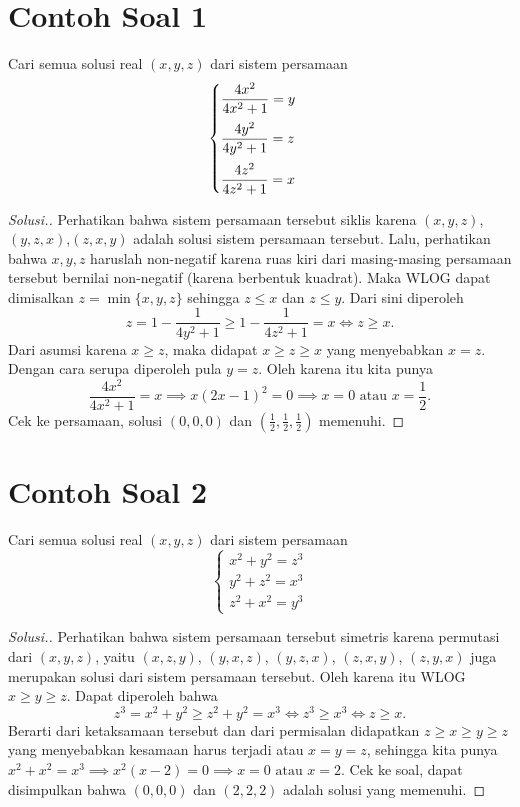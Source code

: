 \documentclass[12pt]{scrartcl}
\begin{document}
\section{Contoh Soal 1}
\begin{example*}
Cari semua solusi real $(x,y,z)$ dari sistem persamaan\\[-10pt] 
		$$\begin{cases}
			\vspace{2mm}
			\dfrac{4x^2}{4x^2+1}=y \\
			\vspace{2mm}
			\dfrac{4y^2}{4y^2+1}=z \\
			\dfrac{4z^2}{4z^2+1}=x
		\end{cases}$$
\end{example*}
\begin{proof}[Solusi.]
Perhatikan bahwa sistem persamaan tersebut siklis karena $(x,y,z)$,
$(y,z,x)$,$(z,x,y)$ adalah solusi sistem persamaan tersebut. Lalu, perhatikan bahwa $x,y,z$ haruslah non-negatif karena ruas kiri dari masing-masing persamaan tersebut bernilai non-negatif (karena berbentuk kuadrat). Maka WLOG dapat dimisalkan $z = \min\{x,y,z\}$ sehingga $z \le x$ dan $z \le y$. Dari sini diperoleh
$$z=1-\dfrac{1}{4y^2+1} \ge 1-\dfrac{1}{4z^2+1}=x \iff z \ge x.$$
Dari asumsi karena $x \ge z$, maka didapat $x \ge z \ge x$ yang menyebabkan $x=z$. Dengan cara serupa diperoleh pula $y=z$. Oleh karena itu kita punya
$$\dfrac{4x^2}{4x^2+1}=x \implies x(2x-1)^2=0 \implies x=0 \text{ atau } x=\frac{1}{2}.$$
Cek ke persamaan, solusi $(0,0,0)$ dan $(\frac{1}{2}, \frac{1}{2}, \frac{1}{2})$ memenuhi.

\end{proof}

\section{Contoh Soal 2}
\begin{example*}
Cari semua solusi real $(x,y,z)$ dari sistem persamaan\\[-10pt] 
		$$\begin{cases}
			x^2+y^2 = z^3\\
			y^2+z^2 = x^3\\
			z^2+x^2 = y^3
		\end{cases}$$
\end{example*}
\begin{proof}[Solusi.] Perhatikan bahwa sistem persamaan tersebut simetris karena permutasi dari $(x,y,z)$, yaitu $(x,z,y)$,  $(y,x,z)$, $(y,z,x)$, $(z,x,y)$, $(z,y,x)$ juga merupakan solusi dari sistem persamaan tersebut. Oleh karena itu WLOG $x \ge y \ge z$. Dapat diperoleh bahwa
$$z^3=x^2+y^2 \ge z^2 + y^2 = x^3 \iff z^3 \ge x^3 \iff z \ge x.$$ 
Berarti dari ketaksamaan tersebut dan dari permisalan didapatkan $z \ge x \ge y \ge z$ yang menyebabkan kesamaan harus terjadi atau $x=y=z$, sehingga kita punya $x^2+x^2=x^3 \implies x^2(x-2)=0 \implies x=0 \text{ atau } x=2$. Cek ke soal, dapat disimpulkan bahwa $(0,0,0)$ dan $(2,2,2)$ adalah solusi yang memenuhi.

\end{proof}
\end{document}
